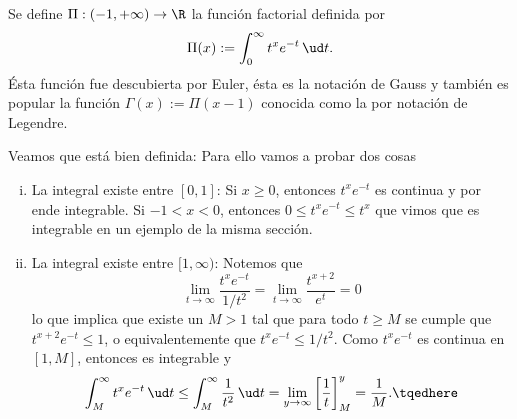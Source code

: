 \begin{mydef}
	Se define $\Pi : (-1, +\infty) \to \R$ la función factorial definida por
	$$ \Pi(x) := \int_0^\infty t^xe^{-t} \, \ud t. $$
	Ésta función fue descubierta por Euler, ésta es la notación de Gauss y también es popular la función $\Gamma(x) := \Pi(x - 1)$ conocida como
	la  por notación de Legendre.
\end{mydef}
Veamos que está bien definida: Para ello vamos a probar dos cosas
\begin{enumerate}[i)]
	\item La integral existe entre $[0,1]$:
		Si $x \ge 0$, entonces $t^xe^{-t}$ es continua y por ende integrable.
		Si $-1 < x < 0$, entonces $0 \le t^xe^{-t} \le t^x$ que vimos que es integrable en un ejemplo de la misma sección.

	\item La integral existe entre $[1, \infty)$:
		Notemos que
		$$ \lim_{t \to \infty} \frac{t^xe^{-t}}{1/t^2} = \lim_{t \to \infty} \frac{t^{x+2}}{e^t} = 0 $$
		lo que implica que existe un $M > 1$ tal que para todo $t \ge M$ se cumple que $t^{x+2}e^{-t} \le 1$, o equivalentemente que $t^xe^{-t} \le 1/t^2$.
		Como $t^xe^{-t}$ es continua en $[1, M]$, entonces es integrable y
		\begin{equation}
			\int_M^\infty t^xe^{-t} \, \ud t \le \int_M^\infty \frac{1}{t^2} \, \ud t
			= \lim_{y\to \infty} \left[ \frac{1}{t} \right]^y_M = \frac{1}{M}. \tqedhere
		\end{equation}
\end{enumerate}

